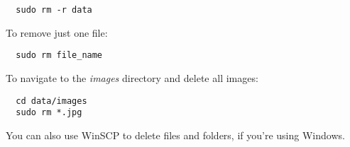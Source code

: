 \documentclass[10pt]{article}
\begin{document}
\begin{verbatim}
  sudo rm -r data
\end{verbatim}

To remove just one file:

\begin{verbatim}
  sudo rm file_name
\end{verbatim}

To navigate to the \textit{images} directory and delete all images:

\begin{verbatim}
  cd data/images
  sudo rm *.jpg
\end{verbatim}

You can also use WinSCP to delete files and folders, if you're using Windows.
\end{document}
